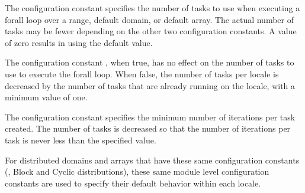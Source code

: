 The configuration constant  specifies the
number of tasks to use when executing a forall loop over a range,
default domain, or default array.  The actual number of tasks may be
fewer depending on the other two configuration constants.  A value of
zero results in using the default value.

The configuration constant , when
true, has no effect on the number of tasks to use to execute the
forall loop.  When false, the number of tasks per locale is decreased
by the number of tasks that are already running on the locale, with a
minimum value of one.

The configuration constant  specifies the
minimum number of iterations per task created.  The number of tasks is
decreased so that the number of iterations per task is never less than
the specified value.

For distributed domains and arrays that have these same configuration
constants (\eg, Block and Cyclic distributions), these same
module level configuration constants are used to specify their
default behavior within each locale.
